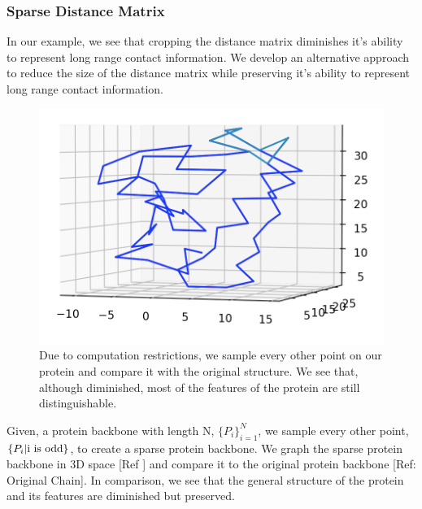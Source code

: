 \documentclass[12pt, a4paper, twocolumn, fullpage]{article}
\theoremstyle{plain}
\theoremstyle{definition}
\theoremstyle{remark}
\begin{document}
\subsubsection{ Sparse Distance Matrix}
In our example, we see that cropping the distance matrix diminishes it's ability to represent long range contact information. We develop an alternative approach to reduce the size of the distance matrix while preserving it's ability to represent long range contact information.

\begin{figure}[h]
    \centering
    \includegraphics[width=\linewidth]{1ux8sparse}
    \caption{Due to computation restrictions, we sample every other point on our protein and compare it with the original structure. We see that, although diminished, most of the features of the protein are still distinguishable.}
    \label{1ux8sparse}
\end{figure}

Given, a protein backbone with length N, $\{P_i\}^{N}_{i=1}$, we sample every other point, $\{P_i \space | \space \text{i is odd} \}$, to create a sparse protein backbone. We graph the sparse protein backbone in 3D space [Ref ] and compare it to the original protein backbone [Ref: Original Chain]. In comparison, we see that the general structure of the protein and its features are diminished but preserved.
\end{document}

